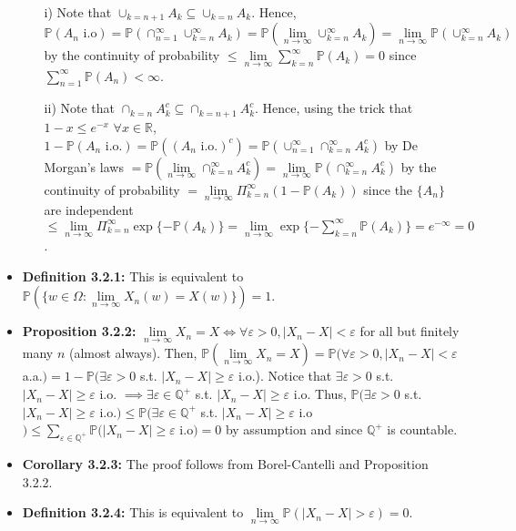 \documentclass[12pt]{article}
\newcommand{\p}{\mathbb{P}}
\begin{document}
\begin{itemize}
    \begin{itemize}
        \item [i)] Note that $\cup_{k=n+1} A_k \subseteq \cup_{k=n} A_k$. Hence, $\p(A_n \text{ i.o}) = \p(\cap_{n=1}^\infty \cup_{k=n}^\infty A_k) = \p(\lim \limits_{n \to \infty} \cup_{k=n}^\infty A_k) = \lim \limits_{n \to \infty} \p(\cup_{k=n}^\infty A_k)$ by the continuity of probability $\leq \lim \limits_{n \to \infty} \sum_{k=n}^\infty \p(A_k) = 0$ since $\sum_{n=1}^\infty \p(A_n) < \infty$.
        \item [ii)] Note that $\cap_{k=n} A_k^c \subseteq \cap_{k=n+1} A_k^c$. Hence, using the trick that $1 - x \leq e^{-x}$ $\forall x \in \mathbb{R}$, $1 - \p(A_n \text{ i.o.}) = \p((A_n \text{ i.o.})^c) = \p(\cup_{n=1}^\infty \cap_{k=n}^\infty A_k^c)$ by De Morgan's laws $= \p(\lim \limits_{n \to \infty} \cap_{k=n}^\infty A_k^c) = \lim \limits_{n \to \infty} \p(\cap_{k=n}^\infty A_k^c)$ by the continuity of probability $= \lim \limits_{n \to \infty} \Pi_{k=n}^\infty (1 - \p(A_k))$ since the $\{A_n\}$ are independent $\leq \lim \limits_{n \to \infty} \Pi_{k=n}^\infty \exp\{-\p(A_k)\} = \lim \limits_{n \to \infty} \exp\{-\sum_{k=n}^\infty \p(A_k)\} = e^{-\infty} = 0$.
    \end{itemize} 
    \item \textbf{Definition 3.2.1:} This is equivalent to $\p(\{w \in \Omega: \lim \limits_{n \to \infty} X_n(w) = X(w)\}) = 1$.
    \item \textbf{Proposition 3.2.2:} $\lim \limits_{n \to \infty} X_n = X \iff \forall \varepsilon > 0, |X_n - X| < \varepsilon$ for all but finitely many $n$ (almost always). Then, $\p(\lim \limits_{n \to \infty} X_n = X) = \p(\forall \varepsilon > 0, |X_n - X| < \varepsilon$ a.a.$) = 1 - \p(\exists \varepsilon > 0$ s.t. $|X_n - X| \geq \varepsilon$ i.o.). Notice that $\exists \varepsilon > 0$ s.t. $|X_n - X| \geq \varepsilon$ i.o. $\implies \exists \varepsilon \in \mathbb{Q}^+$ s.t. $|X_n - X| \geq \varepsilon$ i.o. Thus, $\p(\exists \varepsilon > 0$ s.t. $|X_n - X| \geq \varepsilon$ i.o.$) \leq \p(\exists \varepsilon \in \mathbb{Q}^+$ s.t. $|X_n - X| \geq \varepsilon$ i.o$) \leq \sum_{\varepsilon \in \mathbb{Q}^+} \p(|X_n - X| \geq \varepsilon$ i.o$) = 0$ by assumption and since $\mathbb{Q}^+$ is countable.
    \item \textbf{Corollary 3.2.3:} The proof follows from Borel-Cantelli and Proposition 3.2.2.
    \item \textbf{Definition 3.2.4:} This is equivalent to $\lim \limits_{n \to \infty} \p(|X_n - X| > \varepsilon) = 0$.

\end{itemize}
\end{document}
